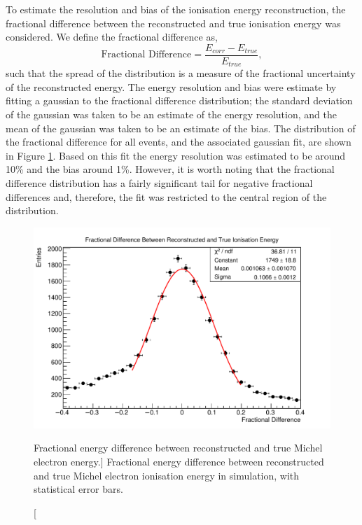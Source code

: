To estimate the resolution and bias of the ionisation energy reconstruction, the
fractional difference between the reconstructed and true ionisation energy was
considered. We define the fractional difference as,
\begin{equation*}
	\mbox{Fractional Difference} = \frac{E_{corr} - E_{true}}{E_{true}},
\end{equation*}
such that the spread of the distribution is a measure of the fractional
uncertainty of the reconstructed energy. The energy resolution and bias were
estimate by fitting a gaussian to the fractional difference distribution; the
standard deviation of the gaussian was taken to be an estimate of the energy
resolution, and the mean of the gaussian was taken to be an estimate of the
bias. The distribution of the fractional difference for all events, and the 
associated gaussian fit, are shown in Figure \ref{fig:frac_diff_ion}. Based on
this fit the energy resolution was estimated to be around 10\% and the bias 
around 1\%. However, it is worth noting that the fractional difference
distribution has a fairly significant tail for negative fractional differences
and, therefore, the fit was restricted to the central region of the distribution.
\begin{figure}
	\centering
	\includegraphics[width=\textwidth]{figures/frac_diff_ion.pdf}
	\caption
	[Fractional energy difference between reconstructed and true Michel electron
	energy.]
	{Fractional energy difference between reconstructed and true Michel electron
	ionisation energy in \protodune{} simulation, with statistical error bars.}
	\label{fig:frac_diff_ion}
\end{figure}

